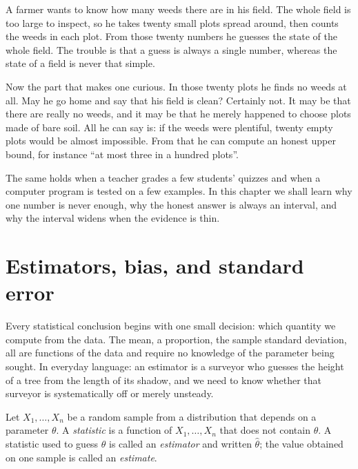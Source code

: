\begin{untukanak}
A farmer wants to know how many weeds there are in his field. The whole field is too large to
inspect, so he takes twenty small plots spread around, then counts the weeds in each plot.
From those twenty numbers he guesses the state of the whole field. The trouble is that a guess
is always a single number, whereas the state of a field is never that simple.

Now the part that makes one curious. In those twenty plots he finds no weeds at all. May he go
home and say that his field is clean? Certainly not. It may be that there are really no weeds,
and it may be that he merely happened to choose plots made of bare soil. All he can say is:
if the weeds were plentiful, twenty empty plots would be almost impossible. From that he can
compute an honest upper bound, for instance ``at most three in a hundred plots''.

The same holds when a teacher grades a few students' quizzes and when a computer program is
tested on a few examples.
In this chapter we shall learn why one number is never enough, why the honest answer is always
an interval, and why the interval widens when the evidence is thin.
\end{untukanak}

\section{Estimators, bias, and standard error}

Every statistical conclusion begins with one small decision: which quantity we compute from
the data. The mean, a proportion, the sample standard deviation, all are functions of the data
and require no knowledge of the parameter being sought. In everyday language: an estimator is
a surveyor who guesses the height of a tree from the length of its shadow, and we need to know
whether that surveyor is systematically off or merely unsteady.


\begin{definisi}
Let $X_1,\dots,X_n$ be a random sample from a distribution that depends on a parameter
$\theta$. A \emph{statistic} is a function of $X_1,\dots,X_n$ that does not contain
$\theta$. A statistic used to guess $\theta$ is called an \emph{estimator} and written
$\hat\theta$; the value obtained on one sample is called an \emph{estimate}.
\end{definisi}

